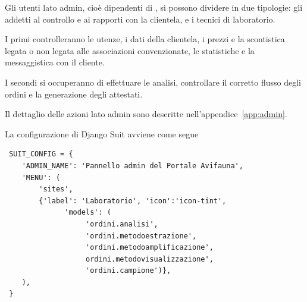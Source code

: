 Gli utenti lato admin, cioè dipendenti di {\fem}, si possono dividere in due tipologie: gli addetti al controllo e ai rapporti con la clientela, e i tecnici di laboratorio.

I primi controlleranno le utenze, i dati della clientela, i prezzi e la scontistica legata o non legata alle associazioni convenzionate, le statistiche e la messaggistica con il cliente.

I secondi si occuperanno di effettuare le analisi, controllare il corretto flusso degli ordini e la generazione degli attestati.

Il dettaglio delle azioni lato admin sono descritte nell'appendice~\ref{app:admin}.

La configurazione di Django Suit avviene come segue
\begin{footnotesize}
\begin{verbatim}
 SUIT_CONFIG = {
    'ADMIN_NAME': 'Pannello admin del Portale Avifauna',
    'MENU': (
        'sites',
        {'label': 'Laboratorio', 'icon':'icon-tint', 
              'models': (
                   'ordini.analisi', 
                   'ordini.metodoestrazione', 
                   'ordini.metodoamplificazione', 
                   ordini.metodovisualizzazione', 
                   'ordini.campione')},
    ),
 }
\end{verbatim}
\end{footnotesize}

